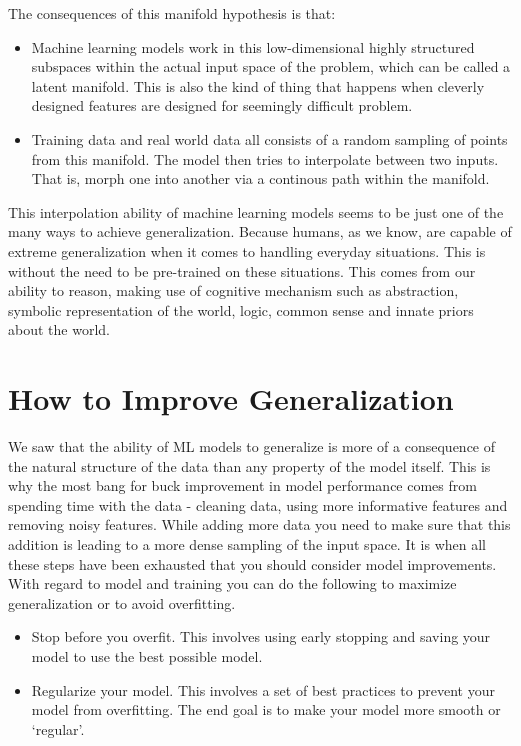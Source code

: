 \documentclass{../template/texnote}
\begin{document}
The consequences of this manifold hypothesis is that:
    \begin{itemize}
        \item Machine learning models work in this low-dimensional highly structured subspaces within the actual input space of the problem, which can be called a latent manifold.
            This is also the kind of thing that happens when cleverly designed features are designed for seemingly difficult problem.
        \item Training data and real world data all consists of a random sampling of points from this manifold. The model then tries to interpolate between two inputs. That is, morph one into another via a continous path within the manifold.
    \end{itemize}
    This interpolation ability of machine learning models seems to be just one of the many ways to achieve generalization.
    Because humans, as we know, are capable of extreme generalization when it comes to handling everyday situations. This is without the need to be pre-trained on 
    these situations.
    This comes from our ability to reason, making use of cognitive mechanism such as abstraction, symbolic representation of the world, logic, common sense and innate priors about the world.
    \section{How to Improve Generalization}
    We saw that the ability of ML models to generalize is more of a consequence of the natural structure of the data than any property of the model itself.
    This is why the most bang for buck improvement in model performance comes from spending time with the data - cleaning data, using more informative features and removing noisy features.
    While adding more data you need to make sure that this addition is leading to a more dense sampling of the input space.
    It is when all these steps have been exhausted that you should consider model improvements.
    With regard to model and training you can do the following to maximize generalization or to avoid overfitting.
        \begin{itemize}
            \item Stop before you overfit. This involves using early stopping and saving your model to use the best possible model.
            \item Regularize your model. This involves a set of best practices to prevent your model from overfitting. The end goal is to make your model more smooth or `regular'.
        \end{itemize}
\end{document}
